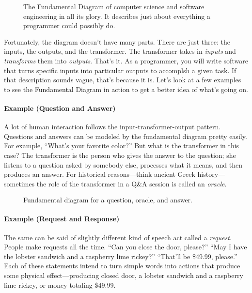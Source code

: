 \begin{figure}[h]
  
  \caption{\label{fig:intro-fundemental-diagram} The Fundamental Diagram of computer science and software engineering in all its glory. It describes just about everything a programmer could possibly do.}
\end{figure}

Fortunately, the diagram doesn't have many parts. There are just three: the inputs, the outputs, and the transformer. The transformer takes in \emph{inputs} and \emph{transforms} them into \emph{outputs}. That's it. As a programmer, you will write software that turns specific inputs into particular outputs to accomplsh a given task. If that description sounds vague, that's because it is. Let's look at a few examples to see the Fundamental Diagram in action to get a better idea of what's going on.

\paragraph{Example (Question and Answer)} A lot of human interaction follows the input-transformer-output pattern. Questions and answers can be modeled by the fundamental diagram pretty easily. For example, ``What's your favorite color?'' But what is the transformer in this case? The transformer is the person who gives the answer to the question; she listens to a question asked by somebody else, processes what it means, and then produces an answer. For historical reasons---think ancient Greek history---sometimes the role of the transformer in a Q\&A session is called an \emph{oracle}.

\begin{figure}[h]
  
  \caption{\label{fig:intro-example-question-answer} Fundamental diagram for a question, oracle, and answer.}
\end{figure}

\paragraph{Example (Request and Response)}The same can be said of slightly different kind of speech act called a \emph{request}. People make requests all the time. ``Can you close the door, please?'' ``May I have the lobster sandwich and a raspberry lime rickey?'' ``That'll be \$49.99, please.'' Each of these statements intend to turn simple words into actions that produce some physical effect---producing closed door, a lobster sandwich and a raspberry lime rickey, or money totaling \$49.99.

